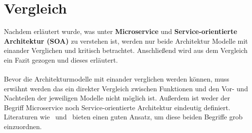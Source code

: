 \chapter{Vergleich}
\label{chap:vergleich}
Nachdem erläutert wurde, was unter \textbf{Microservice} und \textbf{Service-orientierte Architektur (SOA)} zu verstehen ist, werden nur beide Architektur Modelle mit einander Verglichen und kritisch betrachtet. Anschließend wird aus dem Vergleich ein Fazit gezogen und dieses erläutert.
\\\\
Bevor die Architekturmodelle mit einander verglichen werden können, muss erwähnt werden das ein direkter Vergleich zwischen Funktionen und den Vor- und Nachteilen der jeweiligen Modelle nicht möglich ist. Außerdem ist weder der Begriff Microservice noch Service-orientierte Architektur eindeutig definiert. Literaturen wie \cite{100QA}\ und \cite{EWolff2016:Microservices}\ bieten einen guten Ansatz, um diese beiden Begriffe grob einzuordnen.


